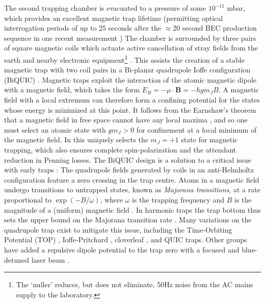 	The second trapping chamber is evacuated to a pressure of some $10^{-11}$ mbar, which provides an excellent magnetic trap lifetime (permitting optical interrogation periods of up to 25 seconds after the $\approx$20 second BEC production sequence in one recent measurement \cite{Thomas20})
	The chamber is surrounded by three pairs of square magnetic coils which actuate active cancellation of stray fields from the earth and nearby electronic equipment\footnote{The `nuller' reduces, but does not eliminate, 50Hz noise from the AC mains supply to the laboratory.} \cite{Dedman07}.
	This assists the creation of a stable magnetic trap with two coil pairs in a Bi-planar quadrupole Ioffe configuration (BiQUIC) \cite{Dall07}.
	Magnetic traps exploit the interaction of the atomic magnetic dipole with a magnetic field, which takes the form $E_B = -\mu\cdot \textbf{B} = -\hbar g m_J B$.
	A magnetic field with a local extremum can therefore form a confining potential for the states whose energy is minimized at this point.
	It follows from the Earnshaw's theorem that a magnetic field in free space cannot have any local maxima \cite{MakingProbingUnderstanding}, and so one must select an atomic state with $g m_J>0$ for confinement at a local minimum of the magnetic field.
	In \mhe this uniquely selects the $m_J=+1$ state for magnetic trapping, which also ensures complete spin-polarization and the attendant reduction in Penning losses.
	The BiQUIC design is a solution to a critical issue with early traps \cite{Migdall85}: The quadrupole fields generated by coils in an anti-Helmholtz configuration feature a zero crossing in the trap centre.
	Atoms in a magnetic field undergo transitions to untrapped states, known as \emph{Majorana transitions}, at a rate proportional to $\exp(-B/\omega)$, where $\omega$ is the trapping frequency and $B$ is the magnitude of a (uniform) magnetic field \cite{Sukumar97}.
	In harmonic traps the trap bottom thus sets the upper bound on the Majorana transition rate \cite{Brink06}.
	Many variations on the quadrupole trap exist to mitigate this issue, including the Time-Orbiting Potential (TOP) \cite{Petrich95}, Ioffe-Pritchard \cite{Pritchard83}, cloverleaf \cite{Mewes97}, and QUIC \cite{Esslinger98} traps.
	Other groups have added a repulsive dipole potential to the trap zero with a focused and blue-detuned laser beam \cite{Papers}.

	

